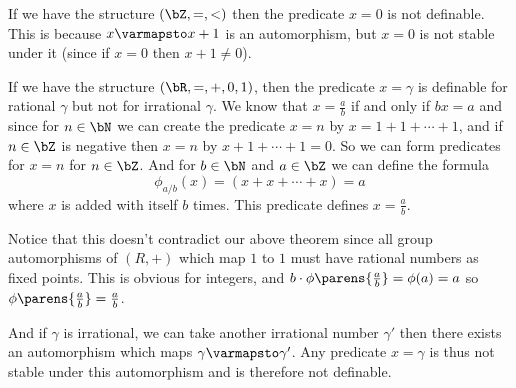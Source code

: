 \documentclass[10pt]{article}
\begin{document}
\begin{exam*}

    If we have the structure $(\bZ,=,<)$ then the predicate $x=0$ is not definable.
    This is because $x\varmapsto x+1$ is an automorphism, but $x=0$ is not stable under it (since if $x=0$ then $x+1\neq0$).

\end{exam*}

\begin{exam*}

    If we have the structure $(\bR,=,+,0,1)$, then the predicate $x=\gamma$ is definable for rational $\gamma$ but not for irrational $\gamma$.
    We know that $x=\frac ab$ if and only if $bx=a$ and since for $n\in\bN$ we can create the predicate $x=n$ by $x=1+1+\cdots+1$, and if $n\in\bZ$ is negative then $x=n$ by $x+1+\cdots+1=0$.
    So we can form predicates for $x=n$ for $n\in\bZ$.
    And for $b\in\bN$ and $a\in\bZ$ we can define the formula
    \[ \phi_{a/b}(x) = (x + x + \cdots + x) = a \]
    where $x$ is added with itself $b$ times.
    This predicate defines $x=\frac ab$.

    Notice that this doesn't contradict our above theorem since all group automorphisms of $(R,+)$ which map $1$ to $1$ must have rational numbers as fixed points.
    This is obvious for integers, and $b\cdot\phi\parens{\frac ab}=\phi(a)=a$ so $\phi\parens{\frac ab}=\frac ab$.

    And if $\gamma$ is irrational, we can take another irrational number $\gamma'$ then there exists an automorphism which maps $\gamma\varmapsto\gamma'$.
    Any predicate $x=\gamma$ is thus not stable under this automorphism and is therefore not definable.

\end{exam*}
\end{document}
